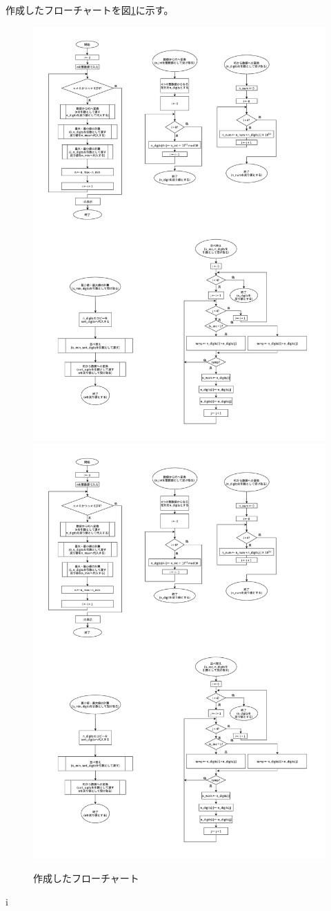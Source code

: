 
作成したフローチャートを図\ref{作成したフローチャート}に示す。

\begin{figure}[H]
    \centering
    \includegraphics[width=0.8\hsize,pagebox=mediabox, page=1]{flowchart.pdf}
    \includegraphics[width=0.8\hsize,pagebox=mediabox, page=2]{flowchart.pdf}
    \label{作成したフローチャート}
    \caption{作成したフローチャート}
\end{figure}


i